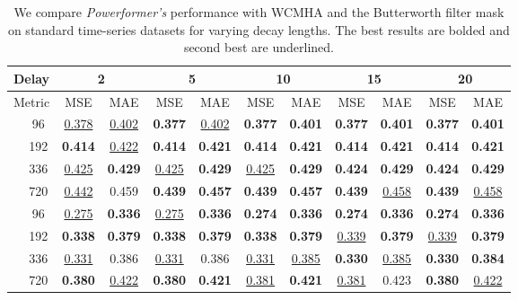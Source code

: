 \begin{table*}[!ht]
    \centering
    \caption{We compare \emph{Powerformer's} performance with WCMHA and the Butterworth filter mask \fbwt{} on standard time-series datasets for varying decay lengths. The best results are bolded and second best are underlined.}
    \label{tab:powerformer_butter2_results}
    \vskip 0.1in
    \begin{tabular}{c|c|cc|cc|cc|cc|cc}
	\toprule
	\multicolumn{2}{c|}{Delay}  & \multicolumn{2}{c|}{2} & \multicolumn{2}{c|}{5} & \multicolumn{2}{c|}{10} & \multicolumn{2}{c|}{15} & \multicolumn{2}{c}{20} \\
	\midrule
	\multicolumn{2}{c|}{Metric} & MSE & MAE & MSE & MAE & MSE & MAE & MSE & MAE & MSE & MAE \\
	\midrule
	\multirow{4}{*}{\rotatebox[origin=c]{90}{\text{ETTh1}}}
		 & 96 &  \underline{0.378} & \underline{0.402} &  \textbf{0.377} & \underline{0.402} &  \textbf{0.377} & \textbf{0.401} &  \textbf{0.377} & \textbf{0.401} &  \textbf{0.377} & \textbf{0.401} \\
		 & 192 &  \textbf{0.414} & \underline{0.422} &  \textbf{0.414} & \textbf{0.421} &  \textbf{0.414} & \textbf{0.421} &  \textbf{0.414} & \textbf{0.421} &  \textbf{0.414} & \textbf{0.421} \\
		 & 336 &  \underline{0.425} & \textbf{0.429} &  \underline{0.425} & \textbf{0.429} &  \underline{0.425} & \textbf{0.429} &  \textbf{0.424} & \textbf{0.429} &  \textbf{0.424} & \textbf{0.429} \\
		 & 720 &  \underline{0.442} & 0.459 &  \textbf{0.439} & \textbf{0.457} &  \textbf{0.439} & \textbf{0.457} &  \textbf{0.439} & \underline{0.458} &  \textbf{0.439} & \underline{0.458} \\ 
	\midrule
	\multirow{4}{*}{\rotatebox[origin=c]{90}{\text{ETTh2}}}
		 & 96 &  \underline{0.275} & \textbf{0.336} &  \underline{0.275} & \textbf{0.336} &  \textbf{0.274} & \textbf{0.336} &  \textbf{0.274} & \textbf{0.336} &  \textbf{0.274} & \textbf{0.336} \\
		 & 192 &  \textbf{0.338} & \textbf{0.379} &  \textbf{0.338} & \textbf{0.379} &  \textbf{0.338} & \textbf{0.379} &  \underline{0.339} & \textbf{0.379} &  \underline{0.339} & \textbf{0.379} \\
		 & 336 &  \underline{0.331} & 0.386 &  \underline{0.331} & 0.386 &  \underline{0.331} & \underline{0.385} &  \textbf{0.330} & \underline{0.385} &  \textbf{0.330} & \textbf{0.384} \\
		 & 720 &  \textbf{0.380} & \underline{0.422} &  \textbf{0.380} & \textbf{0.421} &  \underline{0.381} & \textbf{0.421} &  \underline{0.381} & 0.423 &  \textbf{0.380} & \underline{0.422} \\ 

\end{tabular}
\end{table*}

